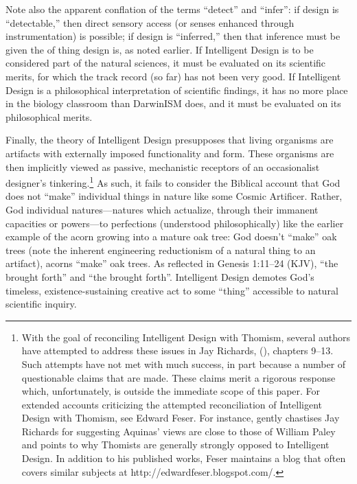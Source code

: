 Note also the apparent conflation of the terms ``detect'' and ``infer'': if design is ``detectable,'' then direct sensory access (or senses enhanced through instrumentation) is possible; if design is ``inferred,'' then that inference must be  given the  of thing design is, as noted earlier. If Intelligent Design is to be considered part of the natural sciences, it must be evaluated on its scientific merits, for which the track record (so far) has not been very good. If Intelligent Design is a philosophical interpretation of scientific findings, it has no more place in the biology classroom than DarwinISM does, and it must be evaluated on its philosophical merits.

Finally, the theory of Intelligent Design presupposes that living organisms are artifacts with externally imposed functionality and form. These organisms are then implicitly viewed as passive, mechanistic receptors of an occasionalist designer's tinkering.\footnote{With the goal of reconciling Intelligent Design with Thomism, several authors have attempted to address these issues in Jay Richards,  (\citeyear{richards2010}), chapters 9--13. Such attempts have not met with much success, in part because a number of questionable claims that are made. These claims merit a rigorous response which, unfortunately, is outside the immediate scope of this paper.  For extended accounts criticizing the attempted reconciliation of Intelligent Design with Thomism, see Edward Feser.  For instance, \citet[][pp.~724,~745]{feser2013} gently chastises Jay Richards for suggesting Aquinas' views are close to those of William Paley and points to why Thomists are generally strongly opposed to Intelligent Design.  In addition to his published works, Feser maintains a blog that often covers similar subjects at http://edwardfeser.blogspot.com/.} 
As such, it fails to consider the Biblical account that God does not ``make'' individual things in nature like some Cosmic Artificer. Rather, God  individual natures---natures which actualize, through their immanent capacities or powers---to perfections (understood philosophically) like the earlier example of the acorn growing into a mature oak tree: God doesn't ``make'' oak trees (note the inherent engineering reductionism of a natural thing to an artifact), acorns ``make'' oak trees. As reflected in Genesis 1:11--24 (KJV), ``the  brought forth'' and ``the  brought forth''. Intelligent Design demotes God's timeless, existence-sustaining creative act to some ``thing'' accessible to natural scientific inquiry.

